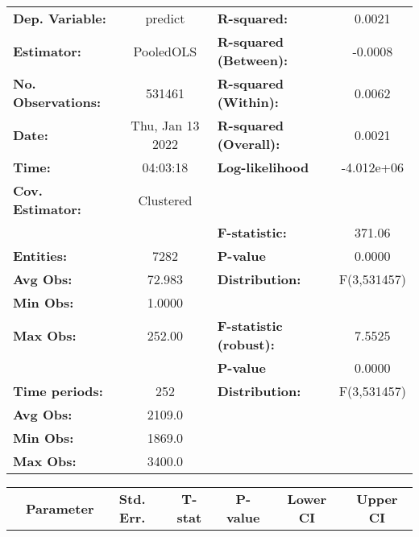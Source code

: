 \begin{center}
\begin{tabular}{lclc}
\toprule
\textbf{Dep. Variable:}    &      predict       & \textbf{  R-squared:         }   &      0.0021      \\
\textbf{Estimator:}        &     PooledOLS      & \textbf{  R-squared (Between):}  &     -0.0008      \\
\textbf{No. Observations:} &       531461       & \textbf{  R-squared (Within):}   &      0.0062      \\
\textbf{Date:}             &  Thu, Jan 13 2022  & \textbf{  R-squared (Overall):}  &      0.0021      \\
\textbf{Time:}             &      04:03:18      & \textbf{  Log-likelihood     }   &    -4.012e+06    \\
\textbf{Cov. Estimator:}   &     Clustered      & \textbf{                     }   &                  \\
\textbf{}                  &                    & \textbf{  F-statistic:       }   &      371.06      \\
\textbf{Entities:}         &        7282        & \textbf{  P-value            }   &      0.0000      \\
\textbf{Avg Obs:}          &       72.983       & \textbf{  Distribution:      }   &   F(3,531457)    \\
\textbf{Min Obs:}          &       1.0000       & \textbf{                     }   &                  \\
\textbf{Max Obs:}          &       252.00       & \textbf{  F-statistic (robust):} &      7.5525      \\
\textbf{}                  &                    & \textbf{  P-value            }   &      0.0000      \\
\textbf{Time periods:}     &        252         & \textbf{  Distribution:      }   &   F(3,531457)    \\
\textbf{Avg Obs:}          &       2109.0       & \textbf{                     }   &                  \\
\textbf{Min Obs:}          &       1869.0       & \textbf{                     }   &                  \\
\textbf{Max Obs:}          &       3400.0       & \textbf{                     }   &                  \\
\bottomrule
\end{tabular}
\begin{tabular}{lcccccc}
                & \textbf{Parameter} & \textbf{Std. Err.} & \textbf{T-stat} & \textbf{P-value} & \textbf{Lower CI} & \textbf{Upper CI}  \\

\end{tabular}
\end{center}
